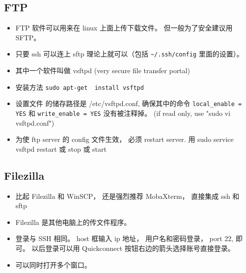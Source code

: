 
\subsection{FTP}
\begin{itemize}
\item FTP 软件可以用来在 linux 上面上传下载文件。 但一般为了安全建议用 SFTP。
\item 只要 ssh 可以连上 sftp 理论上就可以（包括 \verb|~/.ssh/config| 里面的设置）。
\item 其中一个软件叫做 vsftpd (very secure file transfer portal)
\item 安装方法 \verb`sudo apt-get  install vsftpd`
\item 设置文件 的储存路径是 /etc/vsftpd.conf, 确保其中的命令 \verb|local_enable = YES| 和 \verb|write_enable = YES|  没有被注释掉。
(if read only, use "sudo vi vsftpd.conf")
\item 为使 ftp server 的 config 文件生效， 必须 restart server. 用 sudo service vsftpd restart 或 stop 或 start
\end{itemize}

\subsection{Filezilla}
\begin{itemize}
\item 比起 Filezilla 和 WinSCP， 还是强烈推荐 MobaXterm， 直接集成 ssh 和 sftp
\item Filezilla 是其他电脑上的传文件程序。
\item 登录与 SSH 相同。 host 框输入 ip 地址， 用户名和密码登录， port 22, 即可。 以后登录可以用 Quickconnect 按钮右边的箭头选择账号直接登录。
\item 可以同时打开多个窗口。
\end{itemize}

